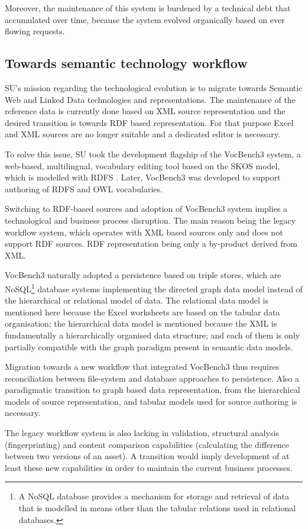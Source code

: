	Moreover,  the maintenance of this system is burdened by a technical debt that accumulated over time, because the system evolved organically based on ever flowing requests. 
	

	\subsection{Towards semantic technology workflow}
	
	SU's mission regarding the technological evolution is to migrate towards Semantic Web and Linked Data technologies and representations. The maintenance of the reference data is currently done based on XML source representation and the desired transition is towards RDF based representation. For that purpose Excel and XML sources are no longer suitable and a dedicated editor is necessary.
	
	To solve this issue, SU took the development flagship of the VocBench3 \citep{stellatovocbench} system, a web-based, multilingual, vocabulary editing tool based on the SKOS \citep{skos-spec} model, which is modelled with RDFS \citep{rdfs1-spec,rdfs11-spec}. Later, VocBench3 was developed to support authoring of RDFS and OWL vocabularies.
	
	Switching to RDF-based sources and adoption of VocBench3 system implies a technological and business process disruption. The main reason being the legacy workflow system, which operates with XML based sources only and does not support RDF sources. RDF representation being only a by-product derived from XML. 
	
	VocBench3 naturally adopted a persistence based on triple stores, which are NoSQL\footnote{A NoSQL database provides a mechanism for storage and retrieval of data that is modelled in means other than the tabular relations used in relational databases.} database systems implementing the directed graph data model instead of the hierarchical or relational model of data. The relational data model is mentioned here because the Excel worksheets are based on the tabular data organisation; the hierarchical data model is mentioned because the XML is fundamentally a hierarchically organised data structure; and each of them is only partially compatible with the graph paradigm present in semantic data models. 
	
	Migration towards a new workflow that integrated VocBench3 thus requires reconciliation between file-system and database approaches to persistence. Also a paradigmatic transition to graph based data representation, from the hierarchical models of source representation, and tabular models used for source authoring is necessary.
	 
	The legacy workflow system is also lacking in validation, structural analysis (fingerprinting) and content comparison capabilities (calculating the difference between two versions of an asset). A transition would imply development of at least these new capabilities in order to maintain the current business processes. 
	